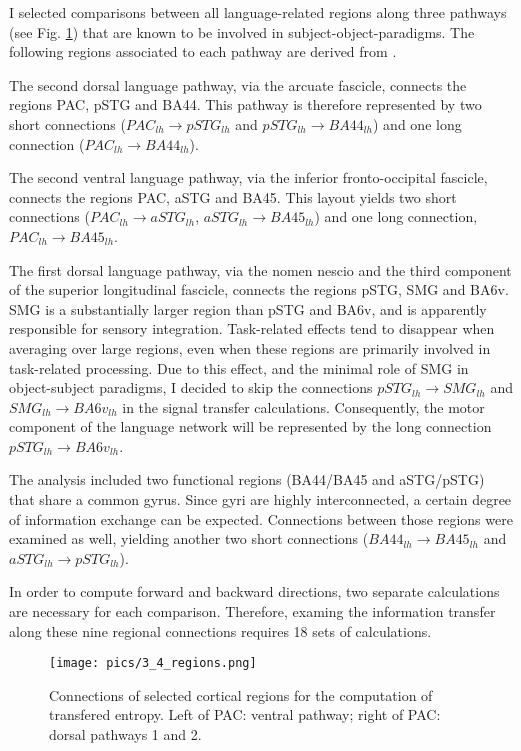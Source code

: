 I selected comparisons between all language-related regions along three pathways (see Fig. \ref{3.4.regions}) that are known to be involved in subject-object-paradigms.
The following regions associated to each pathway are derived from \cite{1.1.pathways}.

The second dorsal language pathway, via the arcuate fascicle, connects the regions PAC, pSTG and BA44.
This pathway is therefore represented by two short connections ($PAC_{lh} \rightarrow pSTG_{lh}$ and $pSTG_{lh} \rightarrow BA44_{lh}$) and one long connection ($PAC_{lh} \rightarrow BA44_{lh}$).

The second ventral language pathway, via the inferior fronto-occipital fascicle, connects the regions PAC, aSTG and BA45.
This layout yields two short connections ($PAC_{lh} \rightarrow aSTG_{lh}$, $aSTG_{lh} \rightarrow BA45_{lh}$) and one long connection, $PAC_{lh} \rightarrow BA45_{lh}$.

The first dorsal language pathway, via the nomen nescio and the third component of the superior longitudinal fascicle, connects the regions pSTG, SMG and BA6v.
SMG is a substantially larger region than pSTG and BA6v, and is apparently responsible for sensory integration.
Task-related effects tend to disappear when averaging over large regions, even when these regions are primarily involved in task-related processing.
Due to this effect, and the minimal role of SMG in object-subject paradigms, I decided to skip the connections $pSTG_{lh} \rightarrow SMG_{lh}$ and $SMG_{lh} \rightarrow BA6v_{lh}$ in the signal transfer calculations.
Consequently, the motor component of the language network will be represented by the long connection $pSTG_{lh} \rightarrow BA6v_{lh}$.

The analysis included two functional regions (BA44/BA45 and aSTG/pSTG) that share a common gyrus.
Since gyri are highly interconnected, a certain degree of information exchange can be expected.
Connections between those regions were examined as well, yielding another two short connections ($BA44_{lh} \rightarrow BA45_{lh}$ and $aSTG_{lh} \rightarrow pSTG_{lh}$).

In order to compute forward and backward directions, two separate calculations are necessary for each comparison.
Therefore, examing the information transfer along these nine regional connections requires 18 sets of calculations.


\begin{figure}[h]
\begin{center}
\vspace{7mm}
\texttt{[image: pics/3\_4\_regions.png]}
\caption{\label{3.4.regions} Connections of selected cortical regions for the computation of transfered entropy. Left of PAC: ventral pathway; right of PAC: dorsal pathways 1 and 2.}
\end{center}
\end{figure}

